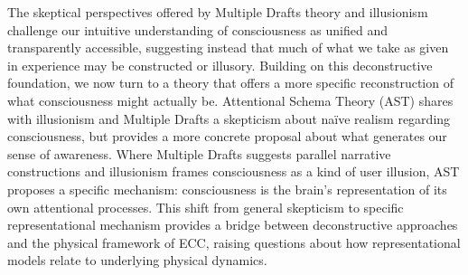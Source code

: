 The skeptical perspectives offered by Multiple Drafts theory and illusionism challenge our intuitive understanding of consciousness as unified and transparently accessible, suggesting instead that much of what we take as given in experience may be constructed or illusory. Building on this deconstructive foundation, we now turn to a theory that offers a more specific reconstruction of what consciousness might actually be. Attentional Schema Theory (AST) shares with illusionism and Multiple Drafts a skepticism about naïve realism regarding consciousness, but provides a more concrete proposal about what generates our sense of awareness. Where Multiple Drafts suggests parallel narrative constructions and illusionism frames consciousness as a kind of user illusion, AST proposes a specific mechanism: consciousness is the brain's representation of its own attentional processes. This shift from general skepticism to specific representational mechanism provides a bridge between deconstructive approaches and the physical framework of ECC, raising questions about how representational models relate to underlying physical dynamics.
